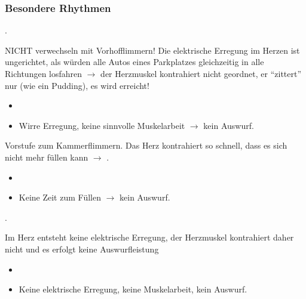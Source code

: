 \subsubsection{Besondere Rhythmen}


{. 

NICHT verwechseln mit
Vorhofflimmern! Die elektrische Erregung im Herzen ist ungerichtet, als würden alle Autos 
eines Parkplatzes gleichzeitig in alle Richtungen losfahren 
${\rightarrow}$ der Herzmuskel kontrahiert nicht
geordnet, er "`zittert"' nur (wie ein Pudding), es wird
 erreicht!
}
{
\begin{itemize}
  \item {}
  \item Wirre Erregung, keine sinnvolle Muskelarbeit ${\rightarrow}$ kein
  Auswurf.
\end{itemize}

}{}{}{}

    
{ 



Vorstufe zum Kammerflimmern. Das Herz kontrahiert
so schnell, dass es sich nicht mehr füllen kann
${\rightarrow}$ .
}
{
\begin{itemize}
  \item  {}
  \item Keine Zeit zum Füllen ${\rightarrow}$ kein Auswurf.
\end{itemize}

}




{. 



Im Herz entsteht keine elektrische
Erregung, der Herzmuskel kontrahiert daher nicht und es erfolgt
{keine Auswurfleistung} 
}{
\begin{itemize}
  \item {}
  \item Keine elektrische Erregung, keine Muskelarbeit, kein Auswurf.
\end{itemize}
}{}{}{}
    
